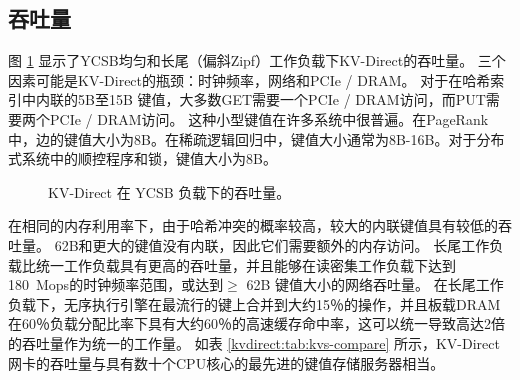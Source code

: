 \subsection{吞吐量}

图 \ref {kvdirect:fig:ycsb-tput} 显示了YCSB均匀和长尾（偏斜Zipf）工作负载下KV-Direct的吞吐量。
三个因素可能是KV-Direct的瓶颈：时钟频率，网络和PCIe / DRAM。
对于在哈希索引中内联的5B至15B 键值，大多数GET需要一个PCIe / DRAM访问，而PUT需要两个PCIe / DRAM访问。
这种小型键值在许多系统中很普遍。在PageRank中，边的键值大小为8B。在稀疏逻辑回归中，键值大小通常为8B-16B。对于分布式系统中的顺控程序和锁，键值大小为8B。


\begin{figure}[htbp]
	\centering
	\caption{KV-Direct 在 YCSB 负载下的吞吐量。}
	\label{kvdirect:fig:ycsb-tput}
\end{figure}


在相同的内存利用率下，由于哈希冲突的概率较高，较大的内联键值具有较低的吞吐量。
62B和更大的键值没有内联，因此它们需要额外的内存访问。
长尾工作负载比统一工作负载具有更高的吞吐量，并且能够在读密集工作负载下达到180~Mops的时钟频率范围，或达到$ \geq $ 62B 键值大小的网络吞吐量。
在长尾工作负载下，无序执行引擎在最流行的键上合并到大约15％的操作，并且板载DRAM在60％负载分配比率下具有大约60％的高速缓存命中率，这可以统一导致高达2倍的吞吐量作为统一的工作量。
如表 \ref {kvdirect:tab:kvs-compare} 所示，KV-Direct 网卡的吞吐量与具有数十个CPU核心的最先进的键值存储服务器相当。


